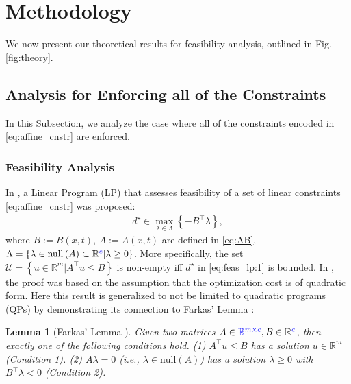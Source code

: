 \documentclass[letterpaper, 10 pt, conference]{ieeeconf}  %
\newtheorem{lemma}{\textbf{Lemma}}
\begin{document}
\section{Methodology}\label{sec:method}
We now present our theoretical results for feasibility analysis, outlined in Fig. \ref{fig:theory}. 

\subsection{Analysis for Enforcing all of the Constraints}

In this Subsection, we analyze the case where all of the constraints encoded in \eqref{eq:affine_cnstr} are enforced. 
\subsubsection{\textbf{Feasibility Analysis \cite{rousseas2025feasibilityevaluationquadraticprograms}}}
{\color{blue}
In \cite{rousseas2025feasibilityevaluationquadraticprograms}, a Linear Program (LP) that assesses feasibility of a set of linear constraints \eqref{eq:affine_cnstr} was proposed:
}
\begin{equation}\label{eq:feas_lp:1}
    \begin{split}
        d^\star \in \underset{\lambda\in\Lambda}{\max}
        \left\{
            -B^\top \lambda 
        \right\},        
    \end{split}
\end{equation}
where $B := B(x,t)$, $A := A(x,t)$ are defined in \eqref{eq:AB}, 
$\Lambda = 
    \left\{ 
        \lambda \in \textrm{null}\left(A\right) \subset \mathbb{R}{\color{blue}^c} 
        |
        \lambda \geq 0
\right\}$. More specifically, the set $\mathcal U=\left\{u\in\mathbb{R}^m | A^\top u \leq B \right\}$ is non-empty iff $d^\star$ in \eqref{eq:feas_lp:1} is bounded. 
In \cite{rousseas2025feasibilityevaluationquadraticprograms}, {\color{blue}the proof was based on the assumption that the optimization cost is of  quadratic form.} Here this result is generalized to not be limited to quadratic programs (QPs) by demonstrating its connection to Farkas' Lemma \cite{Gale1951}:
\begin{lemma}[Farkas' Lemma \cite{Gale1951}]\label{thm:farkas}
    Given two matrices $A\in{\color{blue}\mathbb{R}^{m\times c}},B\in\mathbb{R}{\color{blue}^c}$, then exactly one of the following conditions hold. (1) $A^\top u \leq B$ has a solution $u\in\mathbb{R}^m$ (Condition 1). (2) $A \lambda =0 $ (i.e., $\lambda \in  \textrm{null}(A)$) has a solution $\lambda \geq 0$ with $B^\top \lambda <0$ (Condition 2).
\end{lemma}
\end{document}
